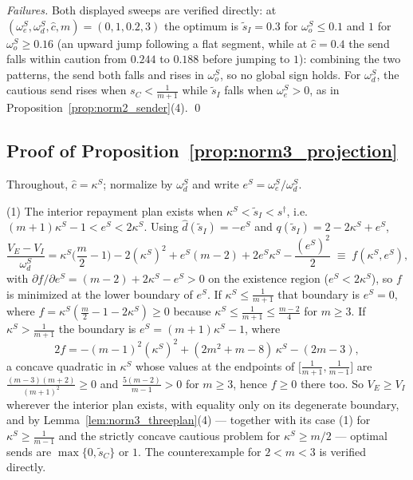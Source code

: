 \documentclass[11pt]{article}
\theoremstyle{plain}
\theoremstyle{remark}
\begin{document}
\emph{Failures.}  Both displayed sweeps are verified directly: at $(\omega_e^S,\omega_d^S,\hat c,m)=(0,1,0.2,3)$ the optimum is $\tilde s_I=0.3$ for $\omega_o^S\le0.1$ and $1$ for $\omega_o^S\ge0.16$ (an upward jump following a flat segment, while at $\hat c=0.4$ the send falls within caution from $0.244$ to $0.188$ before jumping to $1$): combining the two patterns, the send both falls and rises in $\omega_o^S$, so no global sign holds.  For $\omega_d^S$, the cautious send rises when $s_C<\frac1{m+1}$ while $\tilde s_I$ falls when $\omega_e^S>0$, as in Proposition~\ref{prop:norm2_sender}(4).
\qed

\subsection*{Proof of Proposition~\ref{prop:norm3_projection}}

Throughout, $\hat c=\kappa^S$; normalize by $\omega_d^S$ and write $e^S=\omega_e^S/\omega_d^S$.

(1) The interior repayment plan exists when $\kappa^S<\tilde s_I<s^\dagger$, i.e.\ $(m+1)\kappa^S-1<e^S<2\kappa^S$.  Using $\hat d(\tilde s_I)=-e^S$ and $q(\tilde s_I)=2-2\kappa^S+e^S$,
\[
        \frac{V_E-V_I}{\omega_d^S}
        =\kappa^S\Big(\frac m2-1\Big)-2(\kappa^S)^2+e^S(m-2)+2e^S\kappa^S-\frac{(e^S)^2}{2}
        \;\equiv\;
        f(\kappa^S,e^S),
\]
with $\partial f/\partial e^S=(m-2)+2\kappa^S-e^S>0$ on the existence region ($e^S<2\kappa^S$), so $f$ is minimized at the lower boundary of $e^S$.  If $\kappa^S\le\frac1{m+1}$ that boundary is $e^S=0$, where $f=\kappa^S(\tfrac m2-1-2\kappa^S)\ge0$ because $\kappa^S\le\frac1{m+1}\le\frac{m-2}4$ for $m\ge3$.  If $\kappa^S>\frac1{m+1}$ the boundary is $e^S=(m+1)\kappa^S-1$, where
\[
        2f=-(m-1)^2(\kappa^S)^2+(2m^2+m-8)\,\kappa^S-(2m-3),
\]
a concave quadratic in $\kappa^S$ whose values at the endpoints of $\big[\tfrac1{m+1},\tfrac1{m-1}\big]$ are $\frac{(m-3)(m+2)}{(m+1)^2}\ge0$ and $\frac{5(m-2)}{m-1}>0$ for $m\ge3$, hence $f\ge0$ there too.  So $V_E\ge V_I$ wherever the interior plan exists, with equality only on its degenerate boundary, and by Lemma~\ref{lem:norm3_threeplan}(4) --- together with its case (1) for $\kappa^S\ge\frac1{m-1}$ and the strictly concave cautious problem for $\kappa^S\ge m/2$ --- optimal sends are $\max\{0,\tilde s_C\}$ or $1$.  The counterexample for $2<m<3$ is verified directly.
\end{document}
